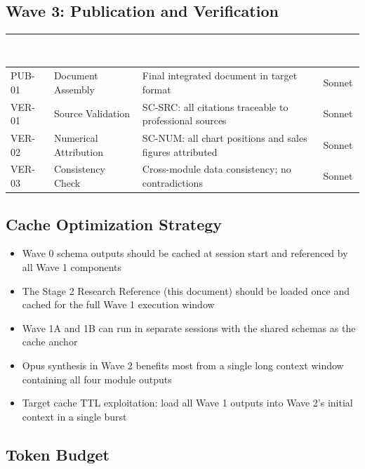 \documentclass[11pt,letterpaper]{article}
\newcommand{\tableheader}[1]{\textbf{\sffamily\textcolor{white}{#1}}}
\begin{document}
\subsection{Wave 3: Publication and Verification}

\begin{center}
\begin{tabularx}{\textwidth}{L{2cm}L{3.5cm}XC{2cm}}
\toprule
{}
\tableheader{Task ID} & \tableheader{Task} & \tableheader{Description} & \tableheader{Model} \\
\midrule
PUB-01 & Document Assembly & Final integrated document in target format & Sonnet \\
VER-01 & Source Validation & SC-SRC: all citations traceable to professional sources & Sonnet \\
VER-02 & Numerical Attribution & SC-NUM: all chart positions and sales figures attributed & Sonnet \\
VER-03 & Consistency Check & Cross-module data consistency; no contradictions & Sonnet \\
\bottomrule
\end{tabularx}
\end{center}

\subsection{Cache Optimization Strategy}

\begin{itemize}
  \item Wave 0 schema outputs should be cached at session start and referenced by all Wave 1 components
  \item The Stage 2 Research Reference (this document) should be loaded once and cached for the full Wave 1 execution window
  \item Wave 1A and 1B can run in separate sessions with the shared schemas as the cache anchor
  \item Opus synthesis in Wave 2 benefits most from a single long context window containing all four module outputs
  \item Target cache TTL exploitation: load all Wave 1 outputs into Wave 2's initial context in a single burst
\end{itemize}

\subsection{Token Budget}
\end{document}

